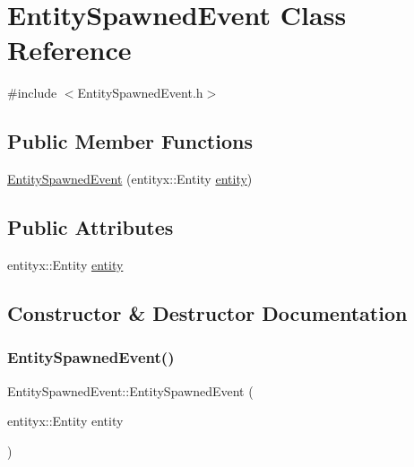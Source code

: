 \hypertarget{classEntitySpawnedEvent}{}\section{Entity\+Spawned\+Event Class Reference}
\label{classEntitySpawnedEvent}


{\ttfamily \#include $<$Entity\+Spawned\+Event.\+h$>$}

\subsection*{Public Member Functions}
\begin{DoxyCompactItemize}
\item 
\hyperlink{classEntitySpawnedEvent_ad5622458ef3448dec870b2f68d009a3d}{Entity\+Spawned\+Event} (entityx\+::\+Entity \hyperlink{classEntitySpawnedEvent_a5c5e65c69bfd2783367202115bcced3c}{entity})
\end{DoxyCompactItemize}
\subsection*{Public Attributes}
\begin{DoxyCompactItemize}
\item 
entityx\+::\+Entity \hyperlink{classEntitySpawnedEvent_a5c5e65c69bfd2783367202115bcced3c}{entity}
\end{DoxyCompactItemize}


\subsection{Constructor \& Destructor Documentation}
\mbox{\label{classEntitySpawnedEvent_ad5622458ef3448dec870b2f68d009a3d}} 
\subsubsection{\texorpdfstring{Entity\+Spawned\+Event()}{EntitySpawnedEvent()}}
{\footnotesize\ttfamily Entity\+Spawned\+Event\+::\+Entity\+Spawned\+Event (\begin{DoxyParamCaption}\item[{entityx\+::\+Entity}]{entity }\end{DoxyParamCaption})\hspace{0.3cm}{\ttfamily [inline]}}



